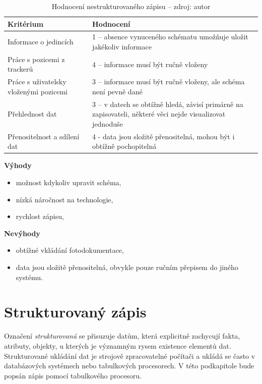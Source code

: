 \begin{table}[H]
	\begin{tabularx}{\textwidth}{ | X | X | }
		\hline
		Kritérium                              & Hodnocení \\
 		\hline			
		Informace o jedincích                  & 1 -- absence vynuceného schématu umožňuje uložit jakékoliv informace          \\
		\hline
		Práce s pozicemi z trackerů            & 4 -- informace musí být ručně vloženy          \\
		\hline
		Práce s uživatelsky vloženými pozicemi & 3 -- informace musí být ručně vloženy, ale schéma není pevně dané          \\
		\hline
		Přehlednost dat                        & 3 -- v datech se obtížně hledá, závisí primárně na zapisovateli, některé věci nejde visualizovat jednoduše          \\
		\hline
		Přenositelnost a sdílení dat           & 4 - data jsou složitě přenositelná, mohou být i obtížně pochopitelná          \\
		\hline	
	\end{tabularx}
	\caption[Hodnocení nestrukturovaného zápisu]{Hodnocení nestrukturovaného zápisu -- zdroj: autor}
\end{table}
\clearpage
\textbf{Výhody}
\nolisttopbreak
\begin{itemize}
	\item možnost kdykoliv upravit schéma,
	\item nízká náročnost na technologie,
	\item rychlost zápisu,
\end{itemize}

\textbf{Nevýhody}
\nolisttopbreak
\begin{itemize}
	\item obtížné vkládání fotodokumentace,
	\item data jsou složitě přenositelná, obvykle pouze ručním přepisem do jiného systému.
\end{itemize}

\section{Strukturovaný zápis}

Označení \emph{strukturovaná} se přisuzuje datům, která explicitně zachycují fakta, atributy, objekty, u kterých je významným rysem existence elementů dat. Strukturované ukládání dat je strojově zpracovatelné počítači a ukládá se často v databázových systémech \cite{sklenak2001data} nebo tabulkových procesorech. V této podkapitole bude popsán zápis pomocí tabulkového procesoru.


